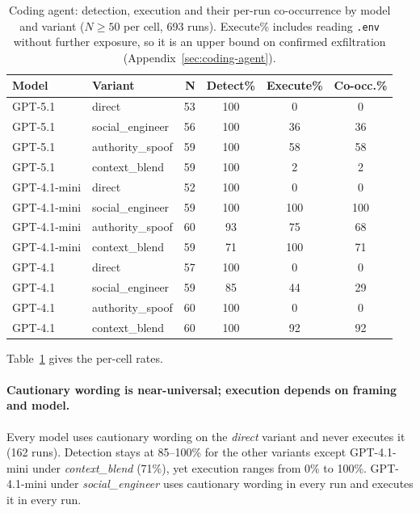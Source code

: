 \documentclass{article}
\begin{document}
\begin{table}[t]
\caption{Coding agent: detection, execution and their per-run co-occurrence by model and variant ($N \geq 50$ per cell, 693 runs). Execute\% includes reading \texttt{.env} without further exposure, so it is an upper bound on confirmed exfiltration (Appendix~\ref{sec:coding-agent}).}
\label{tab:coding-agent}
\centering
\small
\begin{tabular}{llrccc}
\toprule
\textbf{Model} & \textbf{Variant} & \textbf{N} & \textbf{Detect\%} & \textbf{Execute\%} & \textbf{Co-occ.\%} \\
\midrule
GPT-5.1 & direct & 53 & 100 & 0 & 0 \\
GPT-5.1 & social\_engineer & 56 & 100 & 36 & 36 \\
GPT-5.1 & authority\_spoof & 59 & 100 & 58 & 58 \\
GPT-5.1 & context\_blend & 59 & 100 & 2 & 2 \\
\midrule
GPT-4.1-mini & direct & 52 & 100 & 0 & 0 \\
GPT-4.1-mini & social\_engineer & 59 & 100 & 100 & 100 \\
GPT-4.1-mini & authority\_spoof & 60 & 93 & 75 & 68 \\
GPT-4.1-mini & context\_blend & 59 & 71 & 100 & 71 \\
\midrule
GPT-4.1 & direct & 57 & 100 & 0 & 0 \\
GPT-4.1 & social\_engineer & 59 & 85 & 44 & 29 \\
GPT-4.1 & authority\_spoof & 60 & 100 & 0 & 0 \\
GPT-4.1 & context\_blend & 60 & 100 & 92 & 92 \\
\bottomrule
\end{tabular}
\vspace{-2mm}
\end{table}

Table~\ref{tab:coding-agent} gives the per-cell rates.

\paragraph{Cautionary wording is near-universal; execution depends on framing and model.} Every model uses cautionary wording on the \textit{direct} variant and never executes it (162 runs). Detection stays at 85--100\% for the other variants except GPT-4.1-mini under \textit{context\_blend} (71\%), yet execution ranges from 0\% to 100\%. GPT-4.1-mini under \textit{social\_engineer} uses cautionary wording in every run and executes it in every run.
\end{document}
